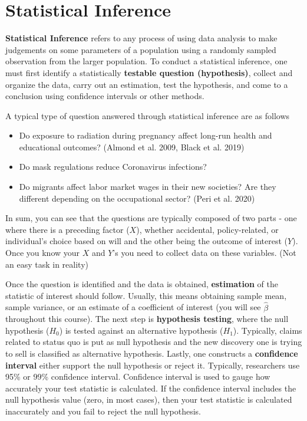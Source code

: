 

\section{Statistical Inference}

\textbf{Statistical Inference} refers to any process of using data analysis to make judgements on some parameters of a population using a randomly sampled observation from the larger population. To conduct a statistical inference, one must first identify a statistically \textbf{testable question (hypothesis)}, collect and organize the data, carry out an estimation, test the hypothesis, and come to a conclusion using confidence intervals or other methods. \par\medskip

A typical type of question answered through statistical inference are as follows
\begin{itemize}
\item Do exposure to radiation during pregnancy affect long-run health and educational outcomes? (Almond et al. 2009, Black et al. 2019) 
\item Do mask regulations reduce Coronavirus infections?
\item Do migrants affect labor market wages in their new societies? Are they different depending on the occupational sector? (Peri et al. 2020)
\end{itemize}
In sum, you can see that the questions are typically composed of two parts - one where there is a preceding factor ($X$), whether accidental, policy-related, or individual's choice based on will and the other being the outcome of interest ($Y$). Once you know your $X$ and $Y$'s you need to collect data on these variables. (Not an easy task in reality)
\par
Once the question is identified and the data is obtained, \textbf{estimation} of the statistic of interest should follow. Usually, this means obtaining sample mean, sample variance, or an estimate of a coefficient of interest (you will see $\hat{\beta}$ throughout this course). The next step is \textbf{hypothesis testing}, where the null hypothesis ($H_0$) is tested against an alternative hypothesis ($H_1$). Typically, claims related to status quo is put as null hypothesis and the new discovery one is trying to sell is classified as alternative hypothesis. Lastly, one constructs a \textbf{confidence interval} either support the null hypothesis or reject it. Typically, researchers use 95\% or 99\% confidence interval. Confidence interval is used to gauge how accurately your test statistic is calculated. If the confidence interval includes the null hypothesis value (zero, in most cases), then your test statistic is calculated inaccurately and you fail to reject the null hypothesis. \par\medskip

